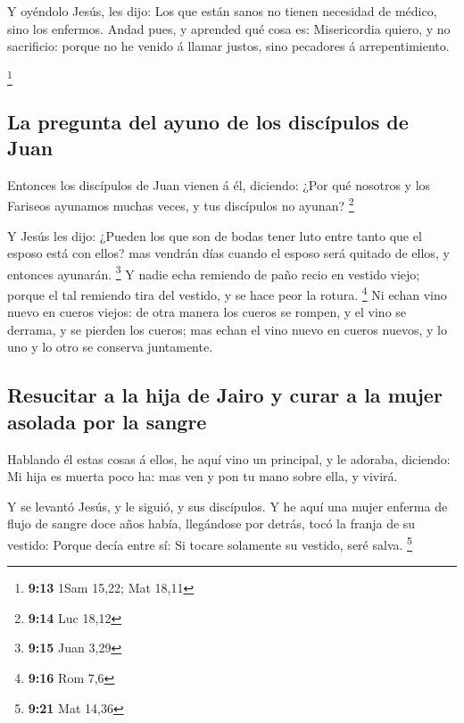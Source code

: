  Y oyéndolo Jesús, les dijo: Los que están sanos no
tienen necesidad de médico, sino los enfermos.  Andad
pues, y aprended qué cosa es: Misericordia quiero, y no sacrificio:
porque no he venido á llamar justos, sino pecadores á arrepentimiento.

\footnote{\textbf{9:13} 1Sam 15,22; Mat 18,11}

\hypertarget{la-pregunta-del-ayuno-de-los-discuxedpulos-de-juan}{%
\subsection{La pregunta del ayuno de los discípulos de
Juan}\label{la-pregunta-del-ayuno-de-los-discuxedpulos-de-juan}}

 Entonces los discípulos de Juan vienen á él, diciendo:
¿Por qué nosotros y los Fariseos ayunamos muchas veces, y tus discípulos
no ayunan? \footnote{\textbf{9:14} Luc 18,12}

 Y Jesús les dijo: ¿Pueden los que son de bodas tener
luto entre tanto que el esposo está con ellos? mas vendrán días cuando
el esposo será quitado de ellos, y entonces ayunarán. \footnote{\textbf{9:15}
  Juan 3,29}  Y nadie echa remiendo de paño recio en
vestido viejo; porque el tal remiendo tira del vestido, y se hace peor
la rotura. \footnote{\textbf{9:16} Rom 7,6}  Ni echan
vino nuevo en cueros viejos: de otra manera los cueros se rompen, y el
vino se derrama, y se pierden los cueros; mas echan el vino nuevo en
cueros nuevos, y lo uno y lo otro se conserva juntamente.

\hypertarget{resucitar-a-la-hija-de-jairo-y-curar-a-la-mujer-asolada-por-la-sangre}{%
\subsection{Resucitar a la hija de Jairo y curar a la mujer asolada por
la
sangre}\label{resucitar-a-la-hija-de-jairo-y-curar-a-la-mujer-asolada-por-la-sangre}}

 Hablando él estas cosas á ellos, he aquí vino un
principal, y le adoraba, diciendo: Mi hija es muerta poco ha: mas ven y
pon tu mano sobre ella, y vivirá.

 Y se levantó Jesús, y le siguió, y sus discípulos.
 Y he aquí una mujer enferma de flujo de sangre doce años
había, llegándose por detrás, tocó la franja de su vestido:
 Porque decía entre sí: Si tocare solamente su vestido,
seré salva. \footnote{\textbf{9:21} Mat 14,36}

